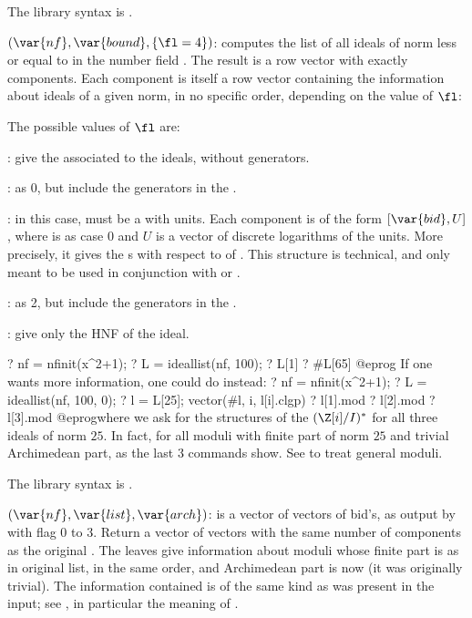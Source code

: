 The library syntax is .

$(\var{nf},\var{bound},\{\fl=4\})$: \label{se:ideallist}computes the list
of all ideals of norm less or equal to  in the number field
. The result is a row vector with exactly  components.
Each component is itself a row vector containing the information about
ideals of a given norm, in no specific order, depending on the value of
$\fl$:

The possible values of $\fl$ are:

: give the  associated to the ideals, without generators.

: as 0, but include the generators in the .

: in this case,  must be a  with units. Each
component is of the form $[\var{bid},U]$, where  is as case 0
and $U$ is a vector of discrete logarithms of the units. More precisely, it
gives the s with respect to  of .
This structure is technical, and only meant to be used in conjunction with
 or .

: as 2, but include the generators in the .

: give only the HNF of the ideal.

\bprog
? nf = nfinit(x^2+1);
? L = ideallist(nf, 100);
? L[1]
? #L[65]
@eprog
If one wants more information, one could do instead:
\bprog
? nf = nfinit(x^2+1);
? L = ideallist(nf, 100, 0);
? l = L[25]; vector(#l, i, l[i].clgp)
? l[1].mod
? l[2].mod
? l[3].mod
@eprog\noindent where we ask for the structures of the $(\Z[i]/I)^*$ for all
three ideals of norm $25$. In fact, for all moduli with finite part of norm
$25$ and trivial Archimedean part, as the last 3 commands show. See
 to treat general moduli.

The library syntax is .

$(\var{nf},\var{list},\var{arch})$: \label{se:ideallistarch}
 is a vector of vectors of bid's, as output by  with
flag $0$ to $3$. Return a vector of vectors with the same number of
components as the original . The leaves give information about
moduli whose finite part is as in original list, in the same order, and
Archimedean part is now  (it was originally trivial). The
information contained is of the same kind as was present in the input; see
, in particular the meaning of \fl.

